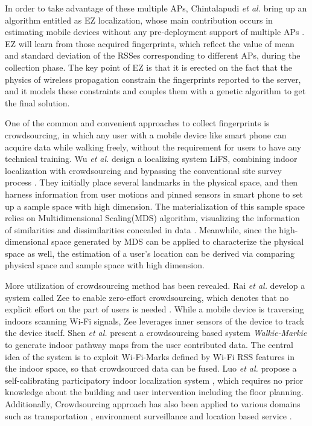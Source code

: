 \documentclass[10pt,conference,compsocconf,letterpaper]{IEEEtran}
\begin{document}
In order to take advantage of these multiple APs, Chintalapudi \emph{et al.} bring up an algorithm entitled as EZ localization, whose main contribution occurs in estimating mobile devices without any pre-deployment support of multiple APs \cite{Chintalapudi10}. EZ will learn from those acquired fingerprints, which reflect the value of mean and standard deviation of the RSSes corresponding to different APs, during the collection phase. The key point of EZ is that it is erected on the fact that the physics of wireless propagation constrain the fingerprints reported to the server, and it models these constraints and couples them with a genetic algorithm to get the final solution.

One of the common and convenient approaches to collect fingerprints is crowdsourcing, in which any user with a mobile device like smart phone can acquire data while walking freely, without the requirement for users to have any technical training. Wu \emph{et al.} design a localizing system LiFS, combining indoor localization with crowdsourcing and bypassing the conventional site survey process \cite{Yang12,Chenshu14}. They initially place several landmarks in the physical space, and then harness information from user motions and pinned sensors in smart phone to set up a sample space with high dimension. The materialization of this sample space relies on Multidimensional Scaling(MDS) algorithm, visualizing the information of similarities and dissimilarities concealed in data \cite{Yang12}. Meanwhile, since the high-dimensional space generated by MDS can be applied to characterize the physical space as well, the estimation of a user’s location can be derived via comparing physical space and sample space with high dimension.

More utilization of crowdsourcing method has been revealed. Rai \emph{et al.} develop a system called Zee to enable zero-effort crowdsourcing, which denotes that no explicit effort on the part of users is needed \cite{Rai12}. While a mobile device is traversing indoors scanning Wi-Fi signals, Zee leverages inner sensors of the device to track the device itself. Shen \emph{et al.} present a crowdsourcing based system \emph{Walkie-Markie} \cite{walkie} to generate indoor pathway maps from the user contributed data. The central idea of the system is to exploit Wi-Fi-Marks defined by Wi-Fi RSS features in the indoor space, so that crowdsourced data can be fused. Luo \emph{et al.} propose a self-calibrating participatory indoor localization system \cite{piloc}, which requires no prior knowledge about the building and user intervention including the floor planning. Additionally, Crowdsourcing approach has also been applied to various domains such as transportation \cite{transportation2}, environment surveillance \cite{environment, environment2} and location based service \cite{lbs,Wen2015Quality}.
\end{document}
